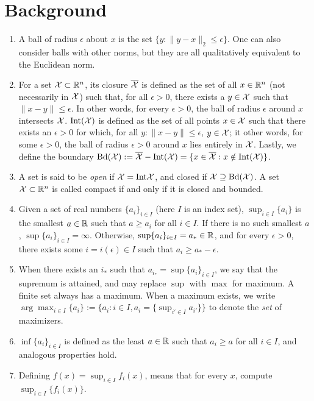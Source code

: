 \documentclass[12pt]{article}
\begin{document}
\section*{Background}
\begin{enumerate}
	\item A ball of radius $\epsilon$ about $x$ is the set $\{y:\|y-x\|_2 \le \epsilon\}$. One can also consider balls with other norms, but they are all qualitatively equivalent to the Euclidean norm. 
	\item For a set ${\cal X} \subset \mathbb{R}^n$, its
	closure $\overline{{\cal X}}$ is defined as the set of all $x \in \mathbb{R}^n$ (not necessarily in ${\cal X}$) such that, for all $\epsilon > 0$, there exists a $y \in {\cal X}$ such that $\|x - y\| \le \epsilon$. In other words, for every $\epsilon > 0$, the ball of radius $\epsilon$ around $x$ intersects ${\cal X}$. $\mathrm{Int}({\cal X})$ is defined as the set of all points $x \in {\cal X}$ such that there exists an $\epsilon > 0$ for which, for all $y: \|x-y\| \le \epsilon$, $y \in {\cal X}$; it other words, for some $\epsilon > 0$, the ball of radius $\epsilon > 0$ around $x$ lies entirely in ${\cal X}$. Lastly, we define the boundary $\mathrm{Bd}({\cal X}) := \overline{{\cal X}} - \mathrm{Int}({\cal X}) = \{x \in \overline{{\cal X}} : x \notin \mathrm{Int}({\cal X})\}$. 
	\item A set is said to be \emph{open} if ${\cal X} = \mathrm{Int} {\cal X}$, and closed if ${\cal X} \supseteq \mathrm{Bd}({\cal X})$. A set ${\cal X} \subset \mathbb{R}^n$ is called compact if and only if it is closed and bounded.
	\item Given a set of real numbers $\{a_i\}_{i \in I}$ (here $I$ is an index set), $\sup_{i \in I} \{a_i\}$ is the smallest $a \in \mathbb{R}$ such that $a \ge a_i$ for all $i \in I$. If there is no such smallest $a$, $\sup \{a_i\}_{i \in I} = \infty$. Otherwise, $\sup \{a_i\}_{i \in I} = a_* \in \mathbb{R}$, and for every $\epsilon > 0$, there exists some $i = i(\epsilon) \in I$ such that $a_i \ge a_* - \epsilon$. 
	\item When there exists an $i_*$ such that $a_{i_*} = \sup \{a_i\}_{i \in I}$, we say that the supremum is attained, and may replace $\sup$ with $\max$ for maximum. A finite set always has a maximum. When a maximum exists, we write $\arg\max_{i \in I} \{a_i\} := \{a_i: i \in I, a_i = \{\sup_{i' \in I} a_{i'}\}\}$ to denote the \emph{set} of maximizers. 
	\item $\inf \{a_i\}_{i \in I}$ is defined as the least $a \in \mathbb{R}$ such that $a_i \ge a$ for all $i \in I$, and analogous properties hold.
	\item Defining $f(x) = \sup_{i \in I} f_i(x)$, means that for every $x$, compute $\sup_{i \in I} \{f_i(x)\}$. 

\end{enumerate}
\end{document}
